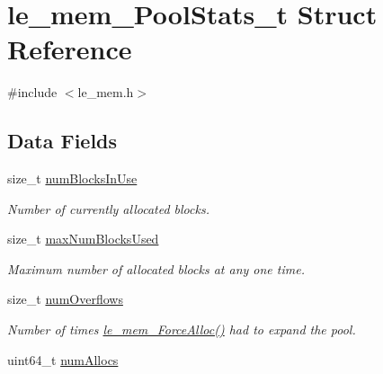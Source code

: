 \hypertarget{structle__mem___pool_stats__t}{}\section{le\+\_\+mem\+\_\+\+Pool\+Stats\+\_\+t Struct Reference}
\label{structle__mem___pool_stats__t}


{\ttfamily \#include $<$le\+\_\+mem.\+h$>$}

\subsection*{Data Fields}
\begin{DoxyCompactItemize}
\item 
size\+\_\+t \hyperlink{structle__mem___pool_stats__t_a313be0351549e89c5137819f67b72e3b}{num\+Blocks\+In\+Use}\hypertarget{structle__mem___pool_stats__t_a313be0351549e89c5137819f67b72e3b}{}\label{structle__mem___pool_stats__t_a313be0351549e89c5137819f67b72e3b}

\begin{DoxyCompactList}\small\item\em Number of currently allocated blocks. \end{DoxyCompactList}\item 
size\+\_\+t \hyperlink{structle__mem___pool_stats__t_ae0ecac2638936865038492db1e7d3d20}{max\+Num\+Blocks\+Used}\hypertarget{structle__mem___pool_stats__t_ae0ecac2638936865038492db1e7d3d20}{}\label{structle__mem___pool_stats__t_ae0ecac2638936865038492db1e7d3d20}

\begin{DoxyCompactList}\small\item\em Maximum number of allocated blocks at any one time. \end{DoxyCompactList}\item 
size\+\_\+t \hyperlink{structle__mem___pool_stats__t_ae60202bce92af5ecb9b0f4a2312be7ec}{num\+Overflows}\hypertarget{structle__mem___pool_stats__t_ae60202bce92af5ecb9b0f4a2312be7ec}{}\label{structle__mem___pool_stats__t_ae60202bce92af5ecb9b0f4a2312be7ec}

\begin{DoxyCompactList}\small\item\em Number of times \hyperlink{le__mem_8h_af7c289c73d4182835a26a9099f3db359}{le\+\_\+mem\+\_\+\+Force\+Alloc()} had to expand the pool. \end{DoxyCompactList}\item 
uint64\+\_\+t \hyperlink{structle__mem___pool_stats__t_abcfdbe19fa0d2deb6bc57858fc0c4512}{num\+Allocs}\hypertarget{structle__mem___pool_stats__t_abcfdbe19fa0d2deb6bc57858fc0c4512}{}\label{structle__mem___pool_stats__t_abcfdbe19fa0d2deb6bc57858fc0c4512}


\end{DoxyCompactItemize}

